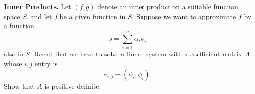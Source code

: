 \textbf{Inner Products.} Let $(f, g)$ denote an inner product on a
suitable function space $S$, and let $f$ be a given function in $S$.
Suppose we want to approximate $f$ by a function \[s = \sum_{i=1}^n
\alpha_i \phi_i\] also in $S$. Recall that we have to solve a linear
system with a coefficient matrix $A$ whose $i,j$ entry is \[a_{i,j} =
(\phi_i, \phi_j).\] Show that $A$ is positive definite.

{\color{blue}



}
